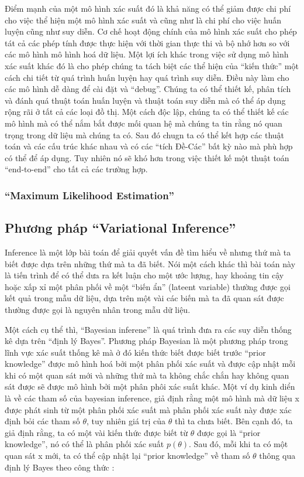         Điểm mạnh của một mô hình xác suất đó là khả năng có thể giảm được chi phí cho việc thể hiện một mô hình xác suất và cũng như là chi phí cho việc huấn luyện cũng như suy diễn. Cơ chế hoạt động chính của mô hình xác suất cho phép tát cả các phép tính được thực hiện với thời gian thực thi và bộ nhớ hơn so với các mô hình mô hình hoá dữ liệu. Một lợi ích khác trong việc sử dụng mô hình xác suất khác đó là cho phép chúng ta tách biệt các thể hiện của ``kiến thức'' một cách chi tiết từ quá trình huấn luyện hay quá trình suy diễn. Điều này làm cho các mô hình dễ dàng để cài đặt và ``debug''. Chúng ta có thể thiết kế, phân tích và đánh quá thuật toán huấn luyện và thuật toán suy diễn mà có thể áp dụng rộng rãi ở tất cả các loại đồ thị. Một cách độc lập, chúng ta có thể thiết kế các mô hình mà có thể nắm bắt được mối quan hệ mà chúng ta tin rằng nó quan trọng trong dữ liệu mà chúng ta có. Sau đó chugn ta có thể kết hợp các thuật toán và các cấu trúc khác nhau và có các ``tích Đề-Các'' bất kỳ nào mà phù hợp có thể để áp dụng. Tuy nhiên nó sẽ khó hơn trong việc thiết kế một thuật toán ``end-to-end'' cho tất cả các trường hợp.

        \subsubsection{ ``Maximum Likelihood Estimation''}
    \subsection{Phương pháp ``Variational Inference'' } \label{chap2/subsec22}

        Inference là một lớp bài toán để giải quyết vấn đề tìm hiểu về nhưng thứ mà ta biết được dựa trên những thứ mà ta đã biết. Nói một cách khác thì bài toán này là tiến trình để có thể dưa ra kết luận cho một ước lượng, hay khoảng tin cậy hoặc xấp xỉ một phân phối về một ``biến ẩn'' (lateent variable) thường được gọi kết quả trong mẫu dữ liệu, dựa trên một vài các biến mà ta đã quan sát được thường được gọi là nguyên nhân trong mẫu dữ liệu. 

        Một cách cụ thể thì, ``Bayesian inferene'' là quá trình đưa ra các suy diễn thống kê dựa trên ``định lý Bayes''. Phương pháp Bayesian là một phương pháp trong lĩnh vực xác suất thống kê mà ở đó kiến thức biết được biết trước ``prior knowledge'' được mô hình hoá bởi một phân phối xác suất và được cập nhật mỗi khi có một quan sát mới và những thứ mà ta không chắc chắn hay không quan sát được sẽ được mô hình bởi một phân phôi xác suất khác. Một ví dụ kinh diển là về các tham số của bayesian inference, giả định rằng một mô hình mà dữ liệu x được phát sinh từ một phân phối xác suất mà phân phối xác suất này được xác định bỏi các tham số $\theta$, tuy nhiên giá trị của $\theta$ thì ta chưa biết. Bên cạnh đó, ta giả định rằng, ta có một vài kiến thức được biết từ $\theta$ được gọi là ``prior knowledge'', nó có thể là phân phối xác suất $p(\theta)$. Sau đó, mỗi khi ta có một quan sát x mới, ta có thể cập nhật lại ``prior knowledge'' về tham số $\theta$ thông qua định lý Bayes theo công thức :

